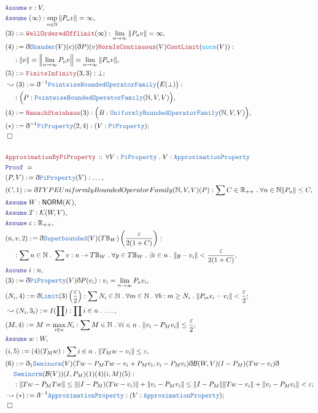 \documentclass[12pt]{scrartcl}
\newcommand{\TYPE}[1]{\textcolor{NavyBlue}{\mathtt{#1}}}
\newcommand{\FUNC}[1]{\textcolor{Cerulean}{\mathtt{#1}}}
\newcommand{\LOGIC}[1]{\textcolor{Blue}{\mathtt{#1}}}
\newcommand{\THM}[1]{\textcolor{Maroon}{\mathtt{#1}}}
\renewcommand{\.}{\; . \;}
\newcommand{\de}{: \kern 0.1pc =}
\newcommand{\Theorem}[2]{& \THM{#1} \, :: \, #2 \\ & \Proof = \\ }
\newcommand{\NewLine}{\\ & \kern 1pc}
\newcommand{\Page}[1]{\begin{align*} #1 \end{align*} \newpage   }
\newcommand{ \bd }{ \ByDef }
\newcommand{\Reals}{\mathbb{R} }
\newcommand{\Nat}{\mathbb{N} }
\newcommand{\Say}[3]{& #1 \de #2 : #3, \\}
\newcommand{\Conclude}[3]{& #1 \de #2 : #3; \\}
\newcommand{\Derive}[3]{& \leadsto #1 \de #2 : #3, \\}
\newcommand{\DeriveConclude}[3]{& \leadsto #1 \de #2 : #3 ; \\}
\newcommand{\A}{\LOGIC{Assume} \;}
\newcommand{\Assume}[2]{& \A #1 : #2, \\}
\newcommand{\QED}{\; \square}
\newcommand{\EndProof}{& \QED \\}
\newcommand{\ByDef}{\eth}
\newcommand{\Proof}{\LOGIC{Proof} \; }
\newcommand{\Ball}{ \mathbb{B} }
\newcommand{\SB}{\TYPE{Superbounded}}
\newcommand{\NORM}{\mathsf{NORM}} %
\newcommand{\K}{\mathcal{K}} %
\newcommand{\B}{\mathcal{B}}
\begin{document}
{} \Page{
\Assume{v}{V}
\Assume{(\infty)}{\sup_{n \in \Nat} \| P_n v \| = \infty}
\Say{(3)}{\THM{WellOrderedOfflimit}(\infty)}{\lim_{n \to \infty} \| P_n v\| = \infty}
\Say{(4)}{\bd \TYPE{Shauder}(V)(e)(\bd P)(v)\THM{NormIsContinuous}(V) \THM{ContLimit}(\FUNC{norm}(V))}{ 
\NewLine :\| v \| = \left\| \lim_{n \to \infty} P_n v \right\| = \lim_{n \to \infty} \| P_n v \|  }
\Conclude{(5)}{\THM{FiniteInfinity}(3,3)}{\bot}
\Derive{(3)}{\bd^{-1} \TYPE{PointwiseBoundedOperatorFamily}\big(E(\bot)\big) }
{\NewLine : \Big( P : \TYPE{PointwiseBoundedOperatorFamily}(\Nat,V,V) \Big)}
\Say{(4)}{\THM{BanachSteinhaus}(3)}{\Big( B : \TYPE{UniformlyBoundedOperatorFamily}(\Nat,V,V) \Big)}
\Conclude{(*)}{\bd^{-1} \TYPE{PiProperty}(2,4)}{ ( V : \TYPE{PiProperty} ) }
\EndProof
 \\
 \Theorem{ApproximationByPiProperty}{\forall V : \TYPE{PiProperty} \.  V : \TYPE{ApproximationProperty} }
 \Say{(P,V)}{\bd \TYPE{PiProperty}(V)}{\ldots}
 \Say{(C,1)}{\bd TYPE{UniformlyBoundedOperatorFamily}(\Nat,V,V)(P)}
 {\sum C \in \Reals_{++} \. \forall n \in \Nat \| P_n \| \le C }
 \Assume{W}{\NORM(K)}
 \Assume{T}{\K(W,V)}
 \Assume{\varepsilon}{\Reals_{++}}
 \Say{(n,v,2) }{ \bd \SB(V)(T\Ball_W)\left( \frac{\varepsilon}{2(1 + C)} \right)}{ 
 \NewLine :
 \sum n \in \Nat \. \sum v : n \to T\Ball_W \. 
 \forall y \in T\Ball_W \. \exists i \in n \. \| y - v_i \| < \frac{\varepsilon}{2(1 + C)} }
 \Assume{i}{n}
 \Say{(3)}{\bd \TYPE{PiProperty}(V) \bd P(v_i)}{ v_i = \lim_{n \to \infty} P_n v_i }
 \Conclude{(N_i,4)}{\bd \TYPE{Limit}(3)\left( \frac{\varepsilon}{2} \right)}{ \sum N_i \in \Nat \. \forall m \in \Nat \. \forall b : m \ge N_i \. 
 \| P_m v_i - v_i   \| < \frac{\varepsilon}{2} }
 \Derive{(N_i,3_i)}{I(\prod)}{\prod i \in n \. \ldots  }
 \Say{(M,4)}{ M = \max_{i \in n} N_i }{\sum M \in \Nat \. \forall i \in n \.  \| v_i - P_M v_i \| \le \frac{\varepsilon}{2}}
 \Assume{w}{W}
 \Say{(i,5)}{(4)(T_M w)}{ \sum i \in n \. \| T_M w - v_i \| \le \varepsilon}
 \Conclude{(6)}{\bd_1 \TYPE{Seminorm}(V)(Tw - P_M Tw - v_i + P_M v_i ,v_i - P_M v_i) 
 \bd \B(W,V) (I - P_M)(Tw - v_i) \bd \NewLine \TYPE{Seminorm}(\B(V))(I,P_M)(1)(4)(i,M)(5)
 }
 { 
 \NewLine :
 \|  Tw -  P_MTw \| \le \| (I - P_M)(Tw - v_i) \| + \| v_i - P_M v_i \| 
  \le  \| I - P_M \| \| Tw - v_i \|  + \| v_i - P_M v_i \| < \varepsilon 
 }
 \DeriveConclude{(*)}{\bd^{-1} \TYPE{ApproximationProperty}}{( V : \TYPE{ApproximationProperty}  )}
 \EndProof
}
\end{document}
